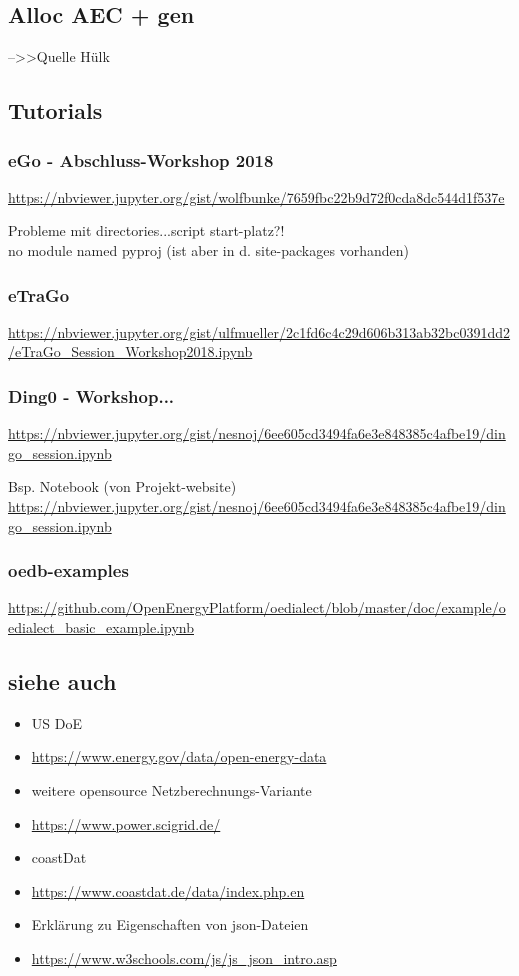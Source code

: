 \documentclass[
a4paper,     %
12pt         %
]{scrartcl}  %
\begin{document}
\subsection{Alloc AEC + gen}
-->>Quelle Hülk

\subsection{Tutorials}
\subsubsection{eGo - Abschluss-Workshop 2018}
\url{https://nbviewer.jupyter.org/gist/wolfbunke/7659fbc22b9d72f0cda8dc544d1f537e}

Probleme mit directories...script start-platz?!\\
no module named pyproj (ist aber in d. site-packages vorhanden)
\subsubsection{eTraGo}
\url{https://nbviewer.jupyter.org/gist/ulfmueller/2c1fd6c4c29d606b313ab32bc0391dd2/eTraGo_Session_Workshop2018.ipynb}
\subsubsection{Ding0 - Workshop...}
\url{https://nbviewer.jupyter.org/gist/nesnoj/6ee605cd3494fa6e3e848385c4afbe19/dingo_session.ipynb}

Bsp. Notebook (von Projekt-website)
\url{https://nbviewer.jupyter.org/gist/nesnoj/6ee605cd3494fa6e3e848385c4afbe19/dingo_session.ipynb}

\subsubsection{oedb-examples}
\url{https://github.com/OpenEnergyPlatform/oedialect/blob/master/doc/example/oedialect_basic_example.ipynb}\\

\subsection{siehe auch}
\begin{itemize}
	\item US DoE
	\item[] \url{https://www.energy.gov/data/open-energy-data}
	\item weitere opensource Netzberechnungs-Variante
	\item[] \url{https://www.power.scigrid.de/}
	\item coastDat
	\item[] \url{https://www.coastdat.de/data/index.php.en}
	\item Erklärung zu Eigenschaften von json-Dateien
	\item[] \url{https://www.w3schools.com/js/js_json_intro.asp}
\end{itemize}
\end{document}

